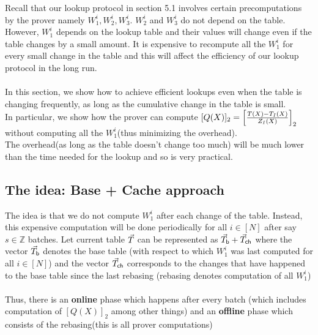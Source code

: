 

Recall that our lookup protocol in section 5.1 involves certain precomputations by the prover namely $W_1^i, W_2^i, W_3^i$. $W_2^i$ and $W_3^i$ do not depend on the table. However, $W_1^i$ depends on the lookup table and their values will change even if the table changes by a small amount. It is expensive to recompute all the $W_1^i$ for every small change in the table and this will affect the efficiency of our lookup protocol in the long run.\\\\
In this section, we show how to achieve efficient lookups even when the table is changing frequently, as long as the cumulative change in the table is small. \\
In particular, we show how the prover can compute $[Q(X)]_2=\left[{\frac{T(X)-T_I(X)}{Z_I(X)}}\right]_2$ without computing all the $W_1^i$(thus minimizing the overhead).\\
The overhead(as long as the table doesn't change too much) will be much lower than the time needed for the lookup and so is very practical.

\subsection{The idea: Base + Cache approach}

The idea is that we do not compute $W_1^i$ after each change of the table. Instead, this expensive computation will be done periodically for all $i \in [N]$ after say $s \in \mathbb{Z}$ batches.
Let current table $\vec{T}$ can be represented as $\vec{T}_{\mathsf{b}} + \vec{T}_{\mathsf{ch}}$ where the vector
$\vec{T}_{\mathsf{b}}$ denotes the base table (with respect to which $W_1^i$ was last computed for all $i \in [N]$) and the vector $\vec{T}_{\mathsf{ch}}$ corresponds to the changes
that have happened to the base table since the last rebasing (rebasing denotes computation of all $W_1^i$)\\\\
Thus, there is an \textbf{online} phase which happens after every batch (which includes computation of $[Q(X)]_2$ among other things) and an \textbf{offline} phase which consists of the rebasing(this is all prover computations) \\\\




